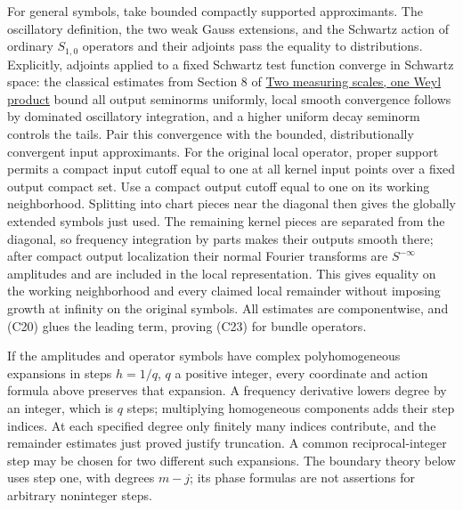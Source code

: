 \documentclass[
  11pt,
]{article}
\makeatletter
\let\ReaderOriginalAnchorStart\hyper@anchorstart
\let\ReaderOriginalAnchorEnd\hyper@anchorend
\let\ReaderPendingAliases\@empty
\def\ReaderArmAliases#1{\gdef\ReaderPendingAliases{#1}}
\def\hyper@anchorstart#1{\ReaderIfNativeAnchorTF{#1}{\ReaderPendingAliases\global\let\ReaderPendingAliases\@empty}{}\ReaderOriginalAnchorStart{#1}}
\makeatother
\begin{document}
For general symbols, take bounded compactly supported approximants. The
oscillatory definition, the two weak Gauss extensions, and the Schwartz
action of ordinary \(S_{1,0}\) operators and their adjoints pass the
equality to distributions. Explicitly, adjoints applied to a fixed
Schwartz test function converge in Schwartz space: the classical
estimates from Section 8 of \href{weyl-metric-products.pdf}{Two measuring
scales, one Weyl product} bound all output seminorms uniformly, local
smooth convergence follows by dominated oscillatory integration, and a
higher uniform decay seminorm controls the tails. Pair this convergence
with the bounded, distributionally convergent input approximants. For
the original local operator, proper support permits a compact input
cutoff equal to one at all kernel input points over a fixed output
compact set. Use a compact output cutoff equal to one on its working
neighborhood. Splitting into chart pieces near the diagonal then gives
the globally extended symbols just used. The remaining kernel pieces are
separated from the diagonal, so frequency integration by parts makes
their outputs smooth there; after compact output localization their
normal Fourier transforms are \(S^{-\infty}\) amplitudes and are
included in the local representation. This gives equality on the working
neighborhood and every claimed local remainder without imposing growth
at infinity on the original symbols. All estimates are componentwise,
and (C20) glues the leading term, proving (C23) for bundle operators.

If the amplitudes and operator symbols have complex polyhomogeneous
expansions in steps \(h=1/q\), \(q\) a positive integer, every
coordinate and action formula above preserves that expansion. A
frequency derivative lowers degree by an integer, which is \(q\) steps;
multiplying homogeneous components adds their step indices. At each
specified degree only finitely many indices contribute, and the
remainder estimates just proved justify truncation. A common
reciprocal-integer step may be chosen for two different such expansions.
The boundary theory below uses step one, with degrees \(m-j\); its phase
formulas are not assertions for arbitrary noninteger steps.

\ReaderArmAliases{\ReaderOriginalAnchorStart{AN03-TR-001}\ReaderOriginalAnchorEnd\begingroup\expandafter\def\csname @currentHref\endcsname{AN03-TR-001}\label{AN03-TR-001}\endgroup\ReaderOriginalAnchorStart{an03-tr-001-what-a-normal-frequency-tail-does-on-one-side}\ReaderOriginalAnchorEnd\begingroup\expandafter\def\csname @currentHref\endcsname{an03-tr-001-what-a-normal-frequency-tail-does-on-one-side}\label{an03-tr-001-what-a-normal-frequency-tail-does-on-one-side}\endgroup\ReaderOriginalAnchorStart{8-what-a-normal-frequency-tail-does-on-one-side}\ReaderOriginalAnchorEnd\begingroup\expandafter\def\csname @currentHref\endcsname{8-what-a-normal-frequency-tail-does-on-one-side}\label{8-what-a-normal-frequency-tail-does-on-one-side}\endgroup\ReaderOriginalAnchorStart{what-a-normal-frequency-tail-does-on-one-side}\ReaderOriginalAnchorEnd}
\end{document}
